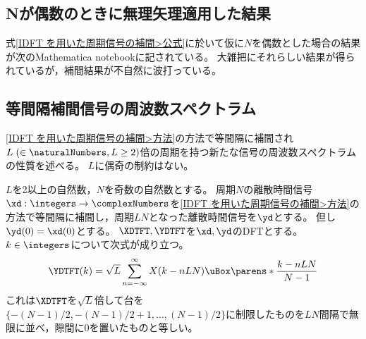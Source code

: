         \subsection{Nが偶数のときに無理矢理適用した結果}
            \label{N が偶数のときに無理矢理適用した結果}
            式\eqref{IDFT を用いた周期信号の補間>公式}に於いて仮に$N$を偶数とした場合の結果が次のMathematica notebookに記されている。
            大雑把にそれらしい結果が得られているが，補間結果が不自然に波打っている。\newline
            \href{\currfiledir/calc/Interpolation_with_IDFT/interpolation_with_IDFT_N=even/interpolation_with_IDFT_N=even.nb}{}
        \subsection{等間隔補間信号の周波数スペクトラム}
            \ref{IDFT を用いた周期信号の補間>方法}の方法で等間隔に補間され$L\;(\in\naturalNumbers,L\geq 2)$倍の周期を持つ新たな信号の周波数スペクトラムの性質を述べる。
            $L$に偶奇の制約はない。
            \begin{shadebox}
                $L$を2以上の自然数，$N$を奇数の自然数とする。
                周期$N$の離散時間信号$\xd:\integers\to\complexNumbers$を\ref{IDFT を用いた周期信号の補間>方法}の方法で等間隔に補間し，周期$LN$となった離散時間信号を$\yd$とする。
                但し$\yd(0) = \xd(0)$とする。
                $\XDTFT,\YDTFT$を$\xd,\yd$のDFTとする。$k\in\integers$について次式が成り立つ。
                \[ \YDTFT(k) = \sqrt{L}\sum_{n=-\infty}^{\infty}X(k-nLN)\uBox\parens*{\frac{k-nLN}{N-1}} \]
                これは$\XDTFT$を$\sqrt{L}$倍して台を$\{-(N-1)/2,-(N-1)/2+1,\dots,(N-1)/2\}$に制限したものを$LN$間隔で無限に並べ，隙間に0を置いたものと等しい。
            \end{shadebox}
